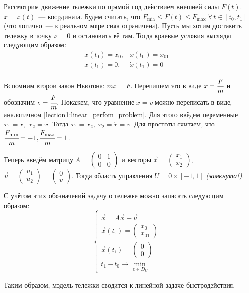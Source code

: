 Рассмотрим движение тележки по прямой под действием внешней силы $F(t)$.
$x = x(t)$~--- координата.
Будем считать, что $F_{\min} \leqslant F(t) \leqslant F_{\max} \; \forall \, t \in [t_0, t_1]$ (что логично~--- в реальном мире сила ограничена).
Пусть мы хотим доставить тележку в точку $x = 0$ и остановить её там.
Тогда краевые условия выглядят следующим образом:
\begin{equation}
    \begin{array}{cc}
        x(t_0) = x_0, & \dot{x}(t_0) = x_{01} \\
        x(t_1) = 0, & \dot{x}(t_1) = 0
    \end{array}
\end{equation}

Вспомним второй закон Ньютона: $m\ddot{x} = F$.
Перепишем это в виде $\ddot{x} = \cfrac{F}{m}$ и обозначим $v = \cfrac{F}{m}$.
Покажем, что уравнение $\ddot{x} = v$ можно переписать в виде, аналогичном \ref{lection1:linear_perfom_problem}.
Для этого ввёдем переменные $x_1 = x, \; x_2 = \dot{x}$.
Тогда $\dot{x_1} = x_2, \; \dot{x_2} = \ddot{x} = v$.
Для простоты считаем, что $\cfrac{F_{\min}}{m} = -1, \cfrac{F_{\max}}{m} = 1$.

Теперь введём матрицу $A = \left( \begin{matrix} 
    0 & 1 \\
    0 & 0 
\end{matrix} \right)$ и векторы ${\vec{x} = \left(\begin{matrix} x_1 \\ x_2 \end{matrix}\right)}$,
                                ${\vec{u} = \left(\begin{matrix} u_1 \\ u_2 \end{matrix} \right) = \left( \begin{matrix} 0 \\ v \end{matrix} \right)}$.
Тогда область управления $U = {0} \times [-1, 1]$ \textit{(замкнута!)}.

С учётом этих обозначений задачу о тележке можно записать следующим образом: 
\begin{equation}
    \begin{cases}
        \dot{\vec{x}} = A\vec{x} + \vec{u} \\
        \vec{x}(t_0) = \left( 
            \begin{matrix}
                x_0 \\
                x_{01}
            \end{matrix} 
        \right)\\
        \vec{x}(t_1) = \left( 
            \begin{matrix}
                0 \\
                0
            \end{matrix} 
        \right)\\
        t_1 - t_0 \rightarrow \min\limits_{u \in D_U}
    \end{cases}
\end{equation}

Таким образом, модель тележки сводится к линейной задаче быстродействия.